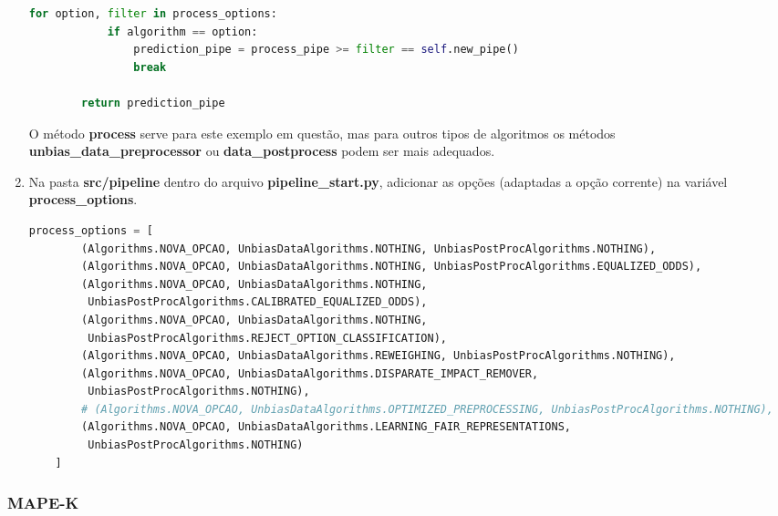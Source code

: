 \documentclass[portugues]{ic-tese}
\begin{document}
\begin{enumerate}
\begin{lstlisting}[language=Python, label=cod:ProcessAlgorithm]
        for option, filter in process_options:
            if algorithm == option:
                prediction_pipe = process_pipe >= filter == self.new_pipe()
                break

        return prediction_pipe
\end{lstlisting}

O método \textbf{process} serve para este exemplo em questão, mas para outros tipos de algoritmos os métodos \textbf{unbias\_data\_preprocessor} ou \textbf{data\_postprocess} podem ser mais adequados.

\item Na pasta \textbf{src/pipeline} dentro do arquivo \textbf{pipeline\_start.py}, adicionar as opções (adaptadas a opção corrente) na variável \textbf{process\_options}.

\begin{lstlisting}[language=Python, label=cod:ParserAddArgumentPipeline]
    process_options = [
        (Algorithms.NOVA_OPCAO, UnbiasDataAlgorithms.NOTHING, UnbiasPostProcAlgorithms.NOTHING),
        (Algorithms.NOVA_OPCAO, UnbiasDataAlgorithms.NOTHING, UnbiasPostProcAlgorithms.EQUALIZED_ODDS),
        (Algorithms.NOVA_OPCAO, UnbiasDataAlgorithms.NOTHING,
         UnbiasPostProcAlgorithms.CALIBRATED_EQUALIZED_ODDS),
        (Algorithms.NOVA_OPCAO, UnbiasDataAlgorithms.NOTHING,
         UnbiasPostProcAlgorithms.REJECT_OPTION_CLASSIFICATION),
        (Algorithms.NOVA_OPCAO, UnbiasDataAlgorithms.REWEIGHING, UnbiasPostProcAlgorithms.NOTHING),
        (Algorithms.NOVA_OPCAO, UnbiasDataAlgorithms.DISPARATE_IMPACT_REMOVER,
         UnbiasPostProcAlgorithms.NOTHING),
        # (Algorithms.NOVA_OPCAO, UnbiasDataAlgorithms.OPTIMIZED_PREPROCESSING, UnbiasPostProcAlgorithms.NOTHING),
        (Algorithms.NOVA_OPCAO, UnbiasDataAlgorithms.LEARNING_FAIR_REPRESENTATIONS,
         UnbiasPostProcAlgorithms.NOTHING)
    ]
\end{lstlisting}

\end{enumerate}

\subsubsection{MAPE-K}
\end{document}
